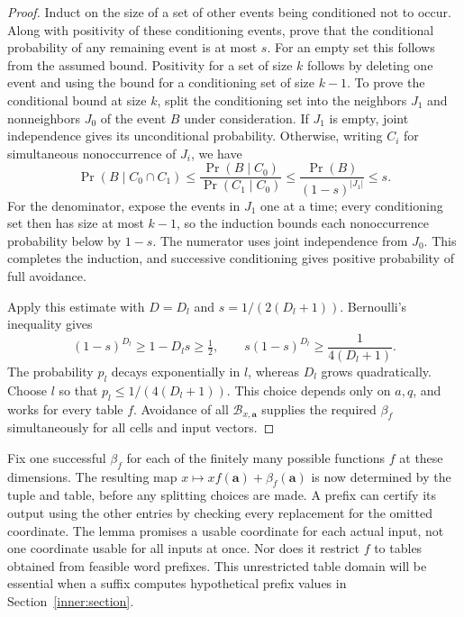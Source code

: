 \begin{proof}
Induct on the size of a set of other events being conditioned not to
occur. Along with positivity of these conditioning events, prove that
the conditional probability of any remaining event is at most $s$.
For an empty set this follows from the assumed bound. Positivity for
a set of size $k$ follows by deleting one event and using the bound
for a conditioning set of size $k-1$. To prove the conditional bound
at size $k$, split the conditioning set into the neighbors $J_1$ and
nonneighbors $J_0$ of the event $B$ under consideration. If $J_1$ is
empty, joint independence gives its unconditional probability. Otherwise,
writing $C_i$ for simultaneous nonoccurrence of $J_i$, we have
\[
 \Pr(B\mid C_0\cap C_1)
 \le \frac{\Pr(B\mid C_0)}{\Pr(C_1\mid C_0)}
 \le \frac{\Pr(B)}{(1-s)^{|J_1|}}
 \le s.
\]
For the denominator, expose the events in $J_1$ one at a time; every
conditioning set then has size at most $k-1$, so the induction bounds
each nonoccurrence probability below by $1-s$. The numerator uses
joint independence from $J_0$. This completes the induction, and
successive conditioning gives positive probability of full avoidance.

Apply this estimate with $D=D_l$ and
$s=1/(2(D_l+1))$. Bernoulli's inequality gives
\[
 (1-s)^{D_l}\ge1-D_ls\ge\tfrac12,
 \qquad s(1-s)^{D_l}\ge\frac1{4(D_l+1)}.
\]
The probability $p_l$ decays exponentially in $l$, whereas $D_l$
grows quadratically. Choose $l$ so that
$p_l\le1/(4(D_l+1))$. This choice depends only on $a,q$, and works
for every table $f$. Avoidance of all $\mathcal B_{x,\mathbf a}$
supplies the required $\beta_f$ simultaneously for all cells and
input vectors.
\end{proof}

Fix one successful $\beta_f$ for each of the finitely many possible
functions $f$ at these dimensions. The resulting map
$x\mapsto xf(\mathbf a)+\beta_f(\mathbf a)$ is now determined by the
tuple and table, before any splitting choices are made. A prefix can
certify its output using the other entries by checking every replacement
for the omitted coordinate. The lemma promises a usable coordinate for
each actual input, not one coordinate usable for all inputs at once.
Nor does it restrict $f$ to tables obtained from feasible word prefixes.
This unrestricted table domain will be essential when a suffix computes
hypothetical prefix values in Section~\ref{inner:section}.
